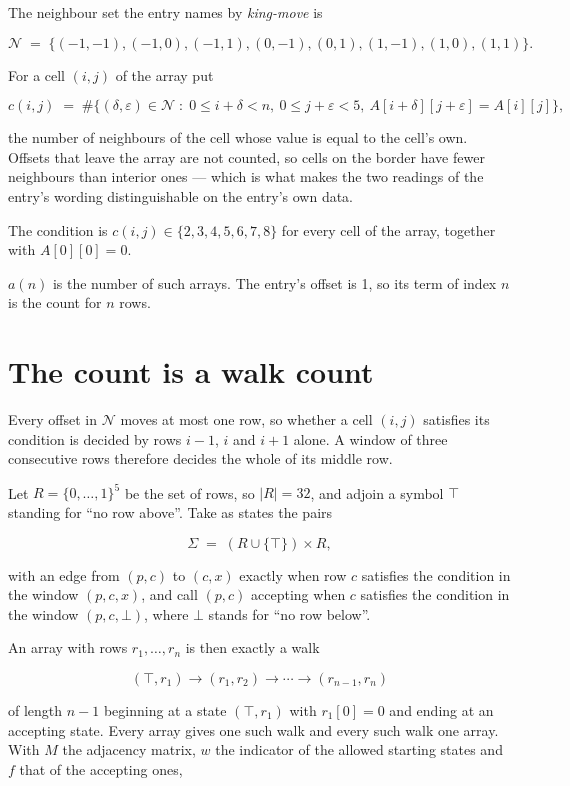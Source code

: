\documentclass[11pt]{article}
\theoremstyle{definition}
\begin{document}
The neighbour set the entry names by {\itshape king-move} is

\[\mathcal{N} \;=\; \{(-1,-1), (-1,0), (-1,1), (0,-1), (0,1), (1,-1), (1,0), (1,1)\}.\]

For a cell $(i,j)$ of the array put

\[c(i,j) \;=\; \#\bigl\{(\delta,\varepsilon)\in\mathcal{N} \;:\; 0\le i+\delta<n,\ 0\le j+\varepsilon<5,\ A[i+\delta][j+\varepsilon] = A[i][j]\bigr\},\]

the number of neighbours of the cell whose value is equal to the cell's own. Offsets that leave the array are not counted, so cells on the border have fewer neighbours than interior ones --- which is what makes the two readings of the entry's wording distinguishable on the entry's own data.

The condition is $c(i,j) \in \{2, 3, 4, 5, 6, 7, 8\}$ for every cell of the array, together with $A[0][0]=0$.

$a(n)$ is the number of such arrays. The entry's offset is 1, so its term of index $n$ is the count for $n$ rows.

\section{The count is a walk count}

Every offset in $\mathcal{N}$ moves at most one row, so whether a cell $(i,j)$ satisfies its condition is decided by rows $i-1$, $i$ and $i+1$ alone. A window of three consecutive rows therefore decides the whole of its middle row.

Let $R = \{0,\dots,1\}^{5}$ be the set of rows, so $|R| = 32$, and adjoin a symbol $\top$ standing for ``no row above''. Take as states the pairs

\[\Sigma \;=\; (R \cup \{\top\}) \times R,\]

with an edge from $(p,c)$ to $(c,x)$ exactly when row $c$ satisfies the condition in the window $(p,c,x)$, and call $(p,c)$ accepting when $c$ satisfies the condition in the window $(p,c,\bot)$, where $\bot$ stands for ``no row below''.

An array with rows $r_1,\dots,r_n$ is then exactly a walk

\[(\top,r_1) \to (r_1,r_2) \to \cdots \to (r_{n-1},r_n)\]

of length $n-1$ beginning at a state $(\top,r_1)$ with $r_1[0]=0$ and ending at an accepting state. Every array gives one such walk and every such walk one array. With $M$ the adjacency matrix, $w$ the indicator of the allowed starting states and $f$ that of the accepting ones,
\end{document}
